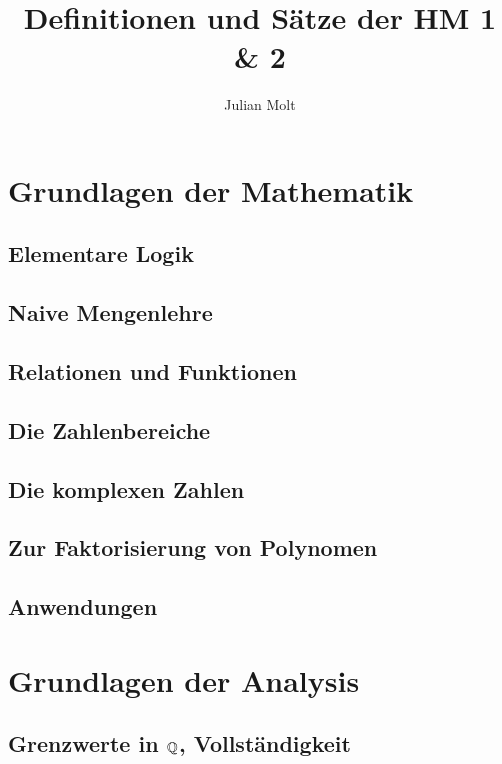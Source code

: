 \documentclass[11pt,a4paper]{report}
\title{\sffamily \textbf{\Huge Definitionen und Sätze der HM 1 \& 2}}
\author{\sffamily \huge{Julian Molt}}
\date{}
\begin{document}
\maketitle
\newpage%
\tableofcontents
\pagebreak

\chapter{Grundlagen der Mathematik}
\section{Elementare Logik}
\section{Naive Mengenlehre}
\section{Relationen und Funktionen}
\section{Die Zahlenbereiche}
\section{Die komplexen Zahlen}
\section{Zur Faktorisierung von Polynomen}

\section{Anwendungen}

\chapter{Grundlagen der Analysis}
\section{\texorpdfstring{Grenzwerte in \(\QQ\), Vollständigkeit}{Grenzwerte in Q, Vollständigkeit}}
\end{document}
